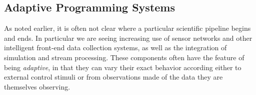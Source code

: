 


\subsection{Adaptive Programming Systems}


As noted earlier, it is often not clear where a particular scientific
pipeline begins and ends. In particular we are seeing increasing use
of sensor networks and other intelligent front-end data collection
systems, as well as the integration of simulation and stream
processing. These components often have the feature of being
\emph{adaptive}, in that they can vary their exact behavior according
either to external control stimuli or from observations made of the
data they are themselves observing.

